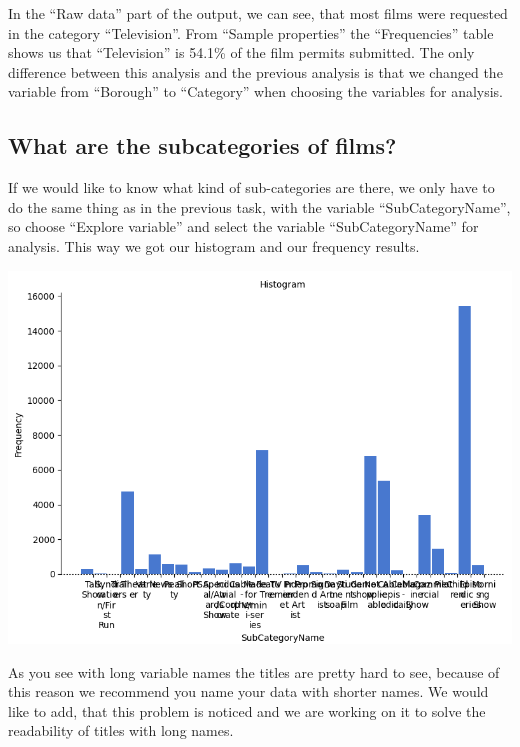 \documentclass[
]{book}
\begin{document}
In the ``Raw data'' part of the output, we can see, that most films were requested in the category ``Television''. From ``Sample properties'' the ``Frequencies'' table shows us that ``Television'' is 54.1\% of the film permits submitted. The only difference between this analysis and the previous analysis is that we changed the variable from ``Borough'' to ``Category'' when choosing the variables for analysis.

\hypertarget{what-are-the-subcategories-of-films}{%
\subsection{What are the subcategories of films?}\label{what-are-the-subcategories-of-films}}

If we would like to know what kind of sub-categories are there, we only have to do the same thing as in the previous task, with the variable ``SubCategoryName'', so choose ``Explore variable'' and select the variable ``SubCategoryName'' for analysis. This way we got our histogram and our frequency results.

\includegraphics{img/ch1/expvar_histogram(subcategory).png}

As you see with long variable names the titles are pretty hard to see, because of this reason we recommend you name your data with shorter names. We would like to add, that this problem is noticed and we are working on it to solve the readability of titles with long names.
\end{document}
